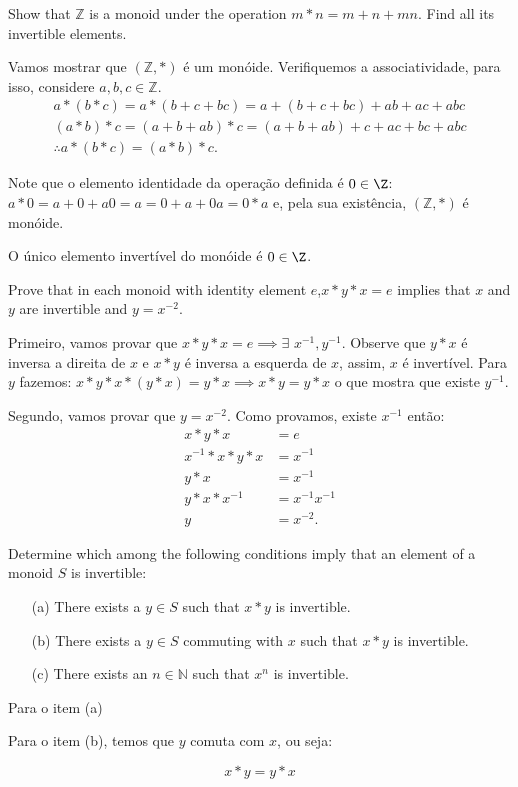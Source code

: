 \begin{exercicio}{1.43}
	Show that $\mathbb{Z}$ is a monoid under the operation $m * n = m + n + mn$. Find all
	its invertible elements.
\end{exercicio}

\begin{solucao}
	Vamos mostrar que $(\mathbb{Z}, *)$ é um monóide. Verifiquemos a associatividade, para isso, considere \(a, b, c \in \mathbb{Z}\).
	\begin{gather*}
		a * (b * c) = a * (b + c + bc) = a + (b + c + bc) + ab + ac + abc \\ 
		(a*b)*c = (a + b + ab) * c = (a + b + ab) + c + ac + bc + abc \\
		\therefore a * (b * c) = (a*b)*c.
	\end{gather*}

	Note que o elemento identidade da operação definida é \(0 \in \Z\): \(a * 0 = a + 0 + a0 = a = 0 + a + 0a = 0 * a\) e, pela sua existência, $(\mathbb{Z}, *)$ é monóide.

	O único elemento invertível do monóide é \(0 \in \Z\).
\end{solucao}

\begin{exercicio}{1.44}
	Prove that in each monoid with identity element $e$,$x * y * x = e$ implies that $x$ and $y$ are invertible and $y = x^{-2}$.
\end{exercicio}

\begin{solucao}
	Primeiro, vamos provar que $x*y*x = e \implies \exists \, \, x^{-1}, y^{-1}$. Observe que \(y * x\) é inversa a direita de $x$ e \(x * y\) é inversa a esquerda de \(x\), assim, \(x\) é invertível. Para \(y\) fazemos: \(x * y * x * (y * x) = y * x \implies x * y = y * x\) o que mostra que existe $y^{-1}$.

	Segundo, vamos provar que $y = x^{-2}$. Como provamos, existe $x^{-1}$ então:
	\begin{align*}
		x * y * x &= e \\
		x^{-1} * x * y * x &= x^{-1} \\
		y * x &= x^{-1} \\
		y * x * x^{-1} &= x^{-1}x^{-1} \\
		y &= x^{-2}. 
	\end{align*}
\end{solucao}

\begin{exercicio}{1.45}
	Determine which among the following conditions imply that an element of a
	monoid \( S \) is invertible:
	\begin{itemize}
		\item[(a)] There exists a \( y \in S \) such that \( x * y \) is invertible.
		\item[(b)] There exists a \( y \in S \) commuting with \( x \) such that \( x * y \) is invertible.
		\item[(c)] There exists an \( n \in \mathbb{N} \) such that \( x^n \) is invertible.
	\end{itemize}
\end{exercicio}

\begin{solucao}
	Para o item (a)

	Para o item (b), temos que \(y\) comuta com \(x\), ou seja:

	\[x * y = y * x\]
\end{solucao}